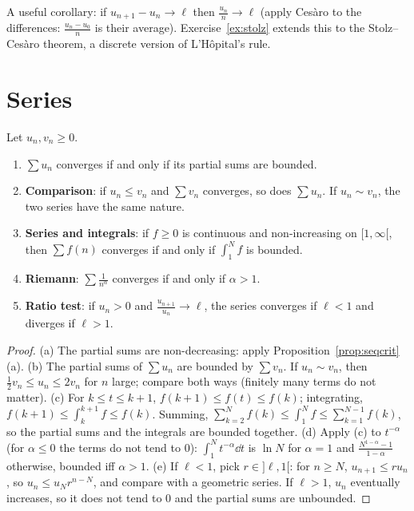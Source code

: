 A useful corollary: if $u_{n+1}-u_n\to\ell$ then $\frac{u_n}n\to\ell$ (apply Ces\`aro to the differences: $\frac{u_n-u_0}n$ is their average).
Exercise~\ref{ex:stolz} extends this to the Stolz--Ces\`aro theorem, a discrete version of L'H\^opital's rule.

\section{Series}

\begin{proposition}\label{prop:posseries}
Let $u_n,v_n\ge0$.
\begin{enumerate}[label=(\alph*)]
\item $\sum u_n$ converges if and only if its partial sums are bounded.
\item \textbf{Comparison}: if $u_n\le v_n$ and $\sum v_n$ converges, so does $\sum u_n$. If $u_n\sim v_n$, the two series have the same nature.
\item \textbf{Series and integrals}: if $f\ge0$ is continuous and non-increasing on $[1,\infty[$, then $\sum f(n)$ converges if and only if $\int_1^Nf$ is bounded.
\item \textbf{Riemann}: $\sum\frac1{n^\alpha}$ converges if and only if $\alpha>1$.
\item \textbf{Ratio test}: if $u_n>0$ and $\frac{u_{n+1}}{u_n}\to\ell$, the series converges if $\ell<1$ and diverges if $\ell>1$.
\end{enumerate}
\end{proposition}
\begin{proof}
(a) The partial sums are non-decreasing: apply Proposition~\ref{prop:seqcrit}(a).
(b) The partial sums of $\sum u_n$ are bounded by $\sum v_n$. If $u_n\sim v_n$, then $\frac12v_n\le u_n\le2v_n$ for $n$ large; compare both ways (finitely many terms do not matter).
(c) For $k\le t\le k+1$, $f(k+1)\le f(t)\le f(k)$; integrating, $f(k+1)\le\int_k^{k+1}f\le f(k)$. Summing, $\sum_{k=2}^{N}f(k)\le\int_1^Nf\le\sum_{k=1}^{N-1}f(k)$, so the partial sums and the integrals are bounded together.
(d) Apply (c) to $t^{-\alpha}$ (for $\alpha\le0$ the terms do not tend to $0$): $\int_1^Nt^{-\alpha}\dd t$ is $\ln N$ for $\alpha=1$ and $\frac{N^{1-\alpha}-1}{1-\alpha}$ otherwise, bounded iff $\alpha>1$.
(e) If $\ell<1$, pick $r\in]\ell,1[$: for $n\ge N$, $u_{n+1}\le ru_n$, so $u_n\le u_Nr^{n-N}$, and compare with a geometric series. If $\ell>1$, $u_n$ eventually increases, so it does not tend to $0$ and the partial sums are unbounded.
\end{proof}

